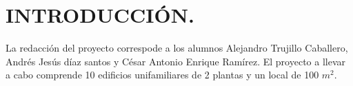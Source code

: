 \section*{INTRODUCCIÓN.}

La redacción del proyecto correspode a los alumnos Alejandro Trujillo Caballero, Andrés Jesús díaz 
santos y César Antonio Enrique Ramírez. El proyecto a llevar a cabo comprende 10 edificios 
unifamiliares de 2 plantas y un local de 100 $m^2$.

